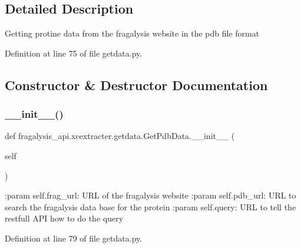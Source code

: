 \subsection{Detailed Description}
\begin{DoxyVerb}Getting protine data from the fragalysis website in the pdb file format
\end{DoxyVerb}
 

Definition at line 75 of file getdata.\+py.



\subsection{Constructor \& Destructor Documentation}
\mbox{\label{classfragalysis__api_1_1xcextracter_1_1getdata_1_1_get_pdb_data_abe03d6df71459bf479db778df7122186}} 
\subsubsection{\texorpdfstring{\+\_\+\+\_\+init\+\_\+\+\_\+()}{\_\_init\_\_()}}
{\footnotesize\ttfamily def fragalysis\+\_\+api.\+xcextracter.\+getdata.\+Get\+Pdb\+Data.\+\_\+\+\_\+init\+\_\+\+\_\+ (\begin{DoxyParamCaption}\item[{}]{self }\end{DoxyParamCaption})}

\begin{DoxyVerb}:param self.frag_url: URL of the fragalysis website
:param self.pdb_url: URL to search the fragalysis data base for the protein
:param self.query: URL to tell the restfull API how to do the query
\end{DoxyVerb}
 

Definition at line 79 of file getdata.\+py.


